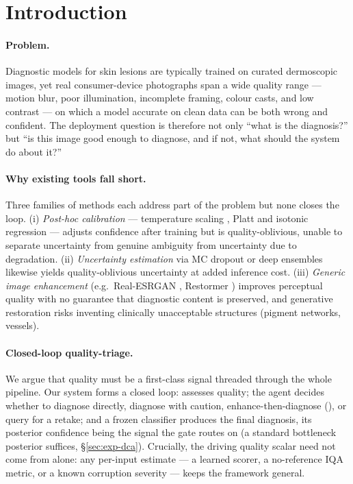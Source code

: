 \section{Introduction}\label{sec:intro}

\paragraph{Problem.}
Diagnostic models for skin lesions are typically trained on curated dermoscopic images, yet real
consumer-device photographs span a wide quality range --- motion blur, poor illumination, incomplete
framing, colour casts, and low contrast --- on which a model accurate on clean data can be both wrong
and confident. The deployment question is therefore not only ``what is the diagnosis?'' but ``is this
image good enough to diagnose, and if not, what should the system do about it?''

\paragraph{Why existing tools fall short.}
Three families of methods each address part of the problem but none closes the loop.
(i) \emph{Post-hoc calibration} --- temperature scaling \citep{guo2017calibration}, Platt and isotonic
regression --- adjusts confidence after training but is quality-oblivious, unable to separate
uncertainty from genuine ambiguity from uncertainty due to degradation.
(ii) \emph{Uncertainty estimation} via MC dropout \citep{gal2016dropout} or deep ensembles
\citep{lakshminarayanan2017simple} likewise yields quality-oblivious uncertainty at added inference
cost.
(iii) \emph{Generic image enhancement} (e.g.\ Real-ESRGAN \citep{wang2021realesrgan}, Restormer
\citep{zamir2022restormer}) improves perceptual quality with no guarantee that diagnostic content is
preserved, and generative restoration risks inventing clinically unacceptable structures (pigment
networks, vessels).

\paragraph{Closed-loop quality-triage.}
We argue that quality must be a first-class signal threaded through the whole pipeline. Our system
forms a closed loop: \visiscore assesses quality; the agent decides whether to diagnose directly,
diagnose with caution, enhance-then-diagnose (\visienhance), or query for a retake; and a frozen
classifier produces the final diagnosis, its posterior confidence being the signal the gate routes on
(a standard bottleneck posterior suffices, \S\ref{sec:exp-dca}). Crucially, the driving quality scalar
need not come from \visiscore alone: any per-input estimate --- a learned scorer, a no-reference IQA
metric, or a known corruption severity --- keeps the framework general.

